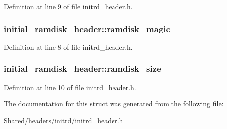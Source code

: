 Definition at line 9 of file initrd\_\-header.h.

\hypertarget{structinitial__ramdisk__header_a1c5e82e06d99171a17e0da88f9a4abb2}{
\subsubsection[{ramdisk\_\-magic}]{ {\bf initial\_\-ramdisk\_\-header::ramdisk\_\-magic}}}
\label{structinitial__ramdisk__header_a1c5e82e06d99171a17e0da88f9a4abb2}


Definition at line 8 of file initrd\_\-header.h.

\hypertarget{structinitial__ramdisk__header_a6a8c51d9c61d606fd922a3a531b7c14f}{
\subsubsection[{ramdisk\_\-size}]{ {\bf initial\_\-ramdisk\_\-header::ramdisk\_\-size}}}
\label{structinitial__ramdisk__header_a6a8c51d9c61d606fd922a3a531b7c14f}


Definition at line 10 of file initrd\_\-header.h.



The documentation for this struct was generated from the following file:\begin{DoxyCompactItemize}
\item 
Shared/headers/initrd/\hyperlink{initrd__header_8h}{initrd\_\-header.h}\end{DoxyCompactItemize}

